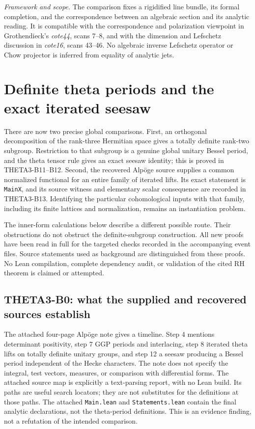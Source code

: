 \documentclass[11pt]{article}
\newcommand{\framework}[1]{\par\smallskip\noindent\textit{Framework and scope.} #1\par}
\theoremstyle{definition}\newtheorem{definition}[theorem]{Definition}\newtheorem{remark}[theorem]{Remark}
\begin{document}
\framework{The comparison fixes a rigidified line bundle, its
formal completion, and the correspondence between an algebraic
section and its analytic reading.  It is compatible with the
correspondence and polarization viewpoint in Grothendieck's
\emph{cote44}, scans 7--8, and with the dimension and Lefschetz
discussion in \emph{cote16}, scans 43--46.  No algebraic inverse
Lefschetz operator or Chow projector is inferred from equality of
analytic jets.}


\section{Definite theta periods and the exact iterated seesaw}

There are now two precise global comparisons. First, an orthogonal decomposition of the rank-three Hermitian space gives a totally definite rank-two subgroup. Restriction to that subgroup is a genuine global unitary Bessel period, and the theta tensor rule gives an exact seesaw identity; this is proved in THETA3-B11--B12. Second, the recovered Alp\"oge source supplies a common normalized functional for an entire family of iterated lifts. Its exact statement is \texttt{MainX}, and its source witness and elementary scalar consequence are recorded in THETA3-B13. Identifying the particular cohomological inputs with that family, including its finite lattices and normalization, remains an instantiation problem.

The inner-form calculations below describe a different possible route. Their obstructions do not obstruct the definite-subgroup construction. All new proofs have been read in full for the targeted checks recorded in the accompanying event files. Source statements used as background are distinguished from these proofs. No Lean compilation, complete dependency audit, or validation of the cited RH theorem is claimed or attempted.

\subsection{THETA3-B0: what the supplied and recovered sources establish}\label{B0}

The attached four-page Alp\"oge note gives a timeline. Step 4 mentions determinant positivity, step 7 GGP periods and interlacing, step 8 iterated theta lifts on totally definite unitary groups, and step 12 a seesaw producing a Bessel period independent of the Hecke characters. The note does not specify the integral, test vectors, measures, or comparison with differential forms. The attached source map is explicitly a text-parsing report, with no Lean build. Its paths are useful search locators; they are not substitutes for the definitions at those paths. The attached \texttt{Main.lean} and \texttt{Statements.lean} contain the final analytic declarations, not the theta-period definitions. This is an evidence finding, not a refutation of the intended comparison.
\end{document}
